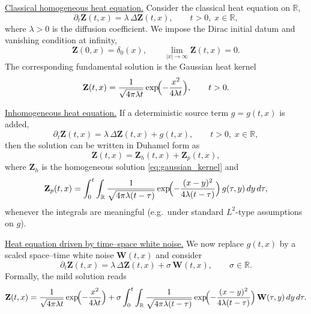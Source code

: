 \documentclass[12pt, reqno]{amsart}
\newcommand{\R}{\ensuremath{\mathbb{R}}}
\newcommand{\bz}{\ensuremath{\mathbf{Z}}}
\newcommand{\bw}{\ensuremath{\mathbf{W}}}
\begin{document}
\noindent\underline{\sf Classical homogeneous heat equation.}
Consider the classical heat equation on $\R$,
\begin{equation}\label{eq:heat_classical}
\partial_t \bz(t,x)=\lambda\,\Delta\bz(t,x),
\qquad t>0,\; x\in\R,
\end{equation}
where $\lambda>0$ is the diffusion coefficient.
We impose the Dirac initial datum and vanishing condition at infinity,
\begin{equation}\label{eq:ICBC_classical}
\bz(0,x)=\delta_0(x),
\qquad
\lim_{|x|\to\infty}\bz(t,x)=0.
\end{equation}
The corresponding fundamental solution is the Gaussian heat kernel
\begin{equation}\label{eq:gaussian_kernel}
\bz(t,x)=\frac{1}{\sqrt{4\pi\lambda t}}
\exp\!\Bigl(-\frac{x^2}{4\lambda t}\Bigr),
\qquad t>0.
\end{equation}

\medskip
\noindent\underline{\sf Inhomogeneous heat equation.}
If a deterministic source term $g=g(t,x)$ is added,
\begin{equation}\label{eq:heat_inhom}
\partial_t \bz(t,x)=\lambda\,\Delta\bz(t,x)+g(t,x),
\qquad t>0,\; x\in\R,
\end{equation}
then the solution can be written in Duhamel form as
\begin{equation}\label{eq:duhamel_det}
\bz(t,x)=\bz_h(t,x)+\bz_p(t,x),
\end{equation}
where $\bz_h$ is the homogeneous solution \eqref{eq:gaussian_kernel} and
\begin{equation}\label{eq:duhamel_particular}
\bz_p(t,x)=\int_0^t\int_{\R}
\frac{1}{\sqrt{4\pi\lambda(t-\tau)}}
\exp\!\Bigl(-\frac{(x-y)^2}{4\lambda(t-\tau)}\Bigr)\,
g(\tau,y)\,dy\,d\tau,
\end{equation}
whenever the integrals are meaningful (e.g.\ under standard $L^2$-type assumptions on $g$).

\medskip
\noindent\underline{\sf Heat equation driven by time--space white noise.}
We now replace $g(t,x)$ by a scaled space--time white noise $\bw(t,x)$ and consider
\begin{equation}\label{eq:stoch_heat_alpha1}
\partial_t\bz(t,x)=\lambda\,\Delta\bz(t,x)+\sigma\,\bw(t,x),
\qquad \sigma\in\R.
\end{equation}
Formally, the mild solution reads
\begin{equation}\label{eq:mild_alpha1}
\bz(t,x)=\frac{1}{\sqrt{4\pi\lambda t}}
\exp\!\Bigl(-\frac{x^2}{4\lambda t}\Bigr)
+
\sigma\int_0^t\int_{\R}
\frac{1}{\sqrt{4\pi\lambda(t-\tau)}}
\exp\!\Bigl(-\frac{(x-y)^2}{4\lambda(t-\tau)}\Bigr)\,
\bw(\tau,y)\,dy\,d\tau.
\end{equation}
\end{document}
